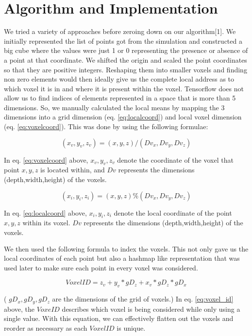\documentclass{article}
\begin{document}
\section{Algorithm and Implementation}
We tried a variety of approaches before zeroing down on our algorithm[1]. We initially represented the list of points got from the simulation and constructed a big cube where the values were just 1 or 0 representing the presence or absence of a point at that coordinate. We shifted the origin and scaled the point coordinates so that they are positive integers. Reshaping them into smaller voxels and finding non zero elements would then ideally give us the complete local address as to which voxel it is in and where it is present within the voxel. Tensorflow does not allow us to find indices of elements represented in a space that is more than 5 dimensions. So, we manually calculated the local means by mapping the 3 dimensions into a grid dimension (eq. \ref{eq:localcoord}) and local voxel dimension (eq. \ref{eq:voxelcoord}). This was done by using the following formulae:

\begin{equation} \label{eq:voxelcoord}
(x_v, y_v, z_v) = (x, y, z) / (Dv_x, Dv_y, Dv_z)
\end{equation}

In eq. \ref{eq:voxelcoord} above, \(x_v, y_v, z_v\) denote the coordinate of the voxel that point \(x, y, z\) is located within, and \(Dv\) represents the dimensions (depth,width,height) of the voxels.

\begin{equation} \label{eq:localcoord}
(x_i, y_i, z_i) = (x, y, z) \% (Dv_x, Dv_y, Dv_z)
\end{equation}

In eq. \ref{eq:localcoord} above, \(x_i, y_i, z_i\) denote the local coordinate of the point \(x, y, z\) within its voxel. \(Dv\) represents the dimensions (depth,width,height) of the voxels. 

We then used the following formula to index the voxels. This not only gave us the local coordinates of each point but also a hashmap like representation that was used later to make sure each point in every voxel was considered.

\begin{equation} \label{eq:voxel_id}
VoxelID = z_v + y_v*gD_z + x_v*gD_z*gD_x
\end{equation}

( \(gD_x, gD_y,gD_z\) are the dimensions of the grid of voxels.) In eq. \ref{eq:voxel_id} above, the \(VoxeID\) describes which voxel is being considered while only using a single value. With this equation, we can effectively flatten out the voxels and reorder as necessary as each \(VoxelID\) is unique. 
\end{document}
